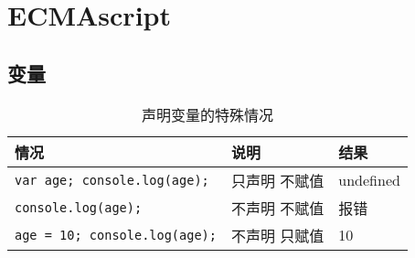 \chapter{ECMAscript}
\section{变量}
\begin{table}
\caption{声明变量的特殊情况}
\centering
\begin{tabular}{lll}
\hline
情况&说明&结果\\
\hline
\verb|var age; console.log(age);|&只声明 不赋值&undefined\\
\verb|console.log(age);|&不声明 不赋值&报错\\
\verb|age = 10; console.log(age);|&不声明 只赋值&10\\
\hline
\end{tabular}
\end{table}